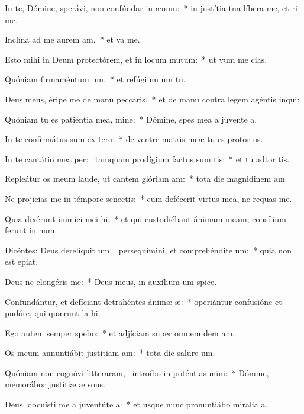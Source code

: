 \item In te, Dómine, sperávi, non confúndar in ænum:~* in justítia tua líbera me, et ri me.
\item Inclína ad me aurem am,~* et va me.
\item Esto mihi in Deum protectórem, et in locum mutum:~* ut vum me cias.
\item Quóniam firmaméntum um,~* et refúgium um  tu.
\item Deus meus, éripe me de manu peccaris,~* et de manu contra legem agéntis  inqui:
\item Quóniam tu es patiéntia mea, mine:~* Dómine, spes mea a juvente a.
\item In te confirmátus sum ex tero:~* de ventre matris meæ tu es protor us.
\item In te cantátio mea per:~\pscross{} tamquam prodígium factus sum tis:~* et tu adtor tis.
\item Repleátur os meum laude, ut cantem glóriam am:~* tota die magnidinem am.
\item Ne projícias me in témpore senectis:~* cum defécerit virtus mea, ne requas me.
\item Quia dixérunt inimíci mei hi:~* et qui custodiébant ánimam meam, consílium ferunt in num.
\item Dicéntes: Deus derelíquit um,~\pscross{} persequímini, et comprehéndite um:~* quia non est  epiat.
\item Deus ne elongéris  me:~* Deus meus, in auxílium um spice.
\item Confundántur, et defíciant detrahéntes ánimæ æ:~* operiántur confusióne et pudóre, qui quærunt la hi.
\item Ego autem semper spebo:~* et adjíciam super omnem dem am.
\item Os meum annuntiábit justítiam am:~* tota die salure um.
\item Quóniam non cognóvi litteraram,~\pscross{} introíbo in poténtias mini:~* Dómine, memorábor justítiæ æ sous.
\item Deus, docuísti me a juventúte a:~* et usque nunc pronuntiábo miralia a.
